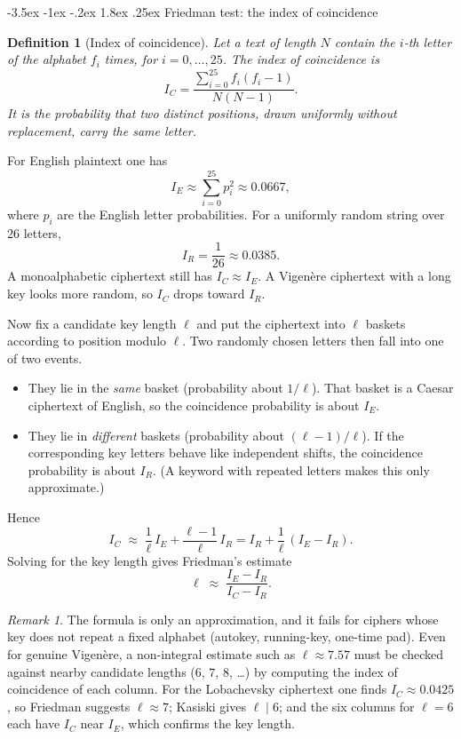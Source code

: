 \documentclass[11pt]{article}
\makeatletter
\renewcommand{\subsection}{\@startsection{subsection}{2}{\z@}%
    {-3.5ex \@plus -1ex \@minus -.2ex}%
    {1.8ex \@plus .25ex}%
    {\normalfont\large\bfseries}}
\newtheorem{definition}[theorem]{Definition}
\theoremstyle{remark}
\newtheorem*{remark}{Remark}
\makeatother
\begin{document}
\subsection{Friedman test: the index of coincidence}

\begin{definition}[Index of coincidence]
Let a text of length $N$ contain the $i$-th letter of the alphabet $f_i$
times, for $i=0,\ldots,25$. The index of coincidence is
\[
    I_C
    =
    \frac{\displaystyle\sum_{i=0}^{25} f_i(f_i-1)}{N(N-1)}.
\]
It is the probability that two distinct positions, drawn uniformly
without replacement, carry the same letter.
\end{definition}

For English plaintext one has
\[
    I_E \approx \sum_{i=0}^{25} p_i^2 \approx 0.0667,
\]
where $p_i$ are the English letter probabilities. For a uniformly random
string over $26$ letters,
\[
    I_R = \frac1{26}\approx 0.0385.
\]
A monoalphabetic ciphertext still has $I_C\approx I_E$. A Vigen\`ere
ciphertext with a long key looks more random, so $I_C$ drops toward
$I_R$.

Now fix a candidate key length $\ell$ and put the ciphertext into $\ell$
baskets according to position modulo $\ell$. Two randomly chosen letters
then fall into one of two events.

\begin{itemize}[leftmargin=1.4em]
    \item They lie in the \emph{same} basket (probability about
    $1/\ell$). That basket is a Caesar ciphertext of English, so the
    coincidence probability is about $I_E$.
    \item They lie in \emph{different} baskets (probability about
    $(\ell-1)/\ell$). If the corresponding key letters behave like
    independent shifts, the coincidence probability is about $I_R$.
    (A keyword with repeated letters makes this only approximate.)
\end{itemize}
Hence
\[
    I_C
    \;\approx\;
    \frac1\ell\, I_E
    +
    \frac{\ell-1}{\ell}\, I_R
    =
    I_R + \frac1\ell\,(I_E-I_R).
\]
Solving for the key length gives Friedman's estimate
\[
    \ell
    \;\approx\;
    \frac{I_E-I_R}{I_C-I_R}.
\]

\begin{remark}
The formula is only an approximation, and it fails for ciphers whose key
does not repeat a fixed alphabet (autokey, running-key, one-time pad).
Even for genuine Vigen\`ere, a non-integral estimate such as
$\ell\approx 7.57$ must be checked against nearby candidate lengths
($6$, $7$, $8$, \ldots) by computing the index of coincidence of each
column. For the Lobachevsky ciphertext one finds $I_C\approx 0.0425$, so
Friedman suggests $\ell\approx 7$; Kasiski gives $\ell\mid 6$; and the
six columns for $\ell=6$ each have $I_C$ near $I_E$, which confirms the
key length.
\end{remark}
\end{document}

